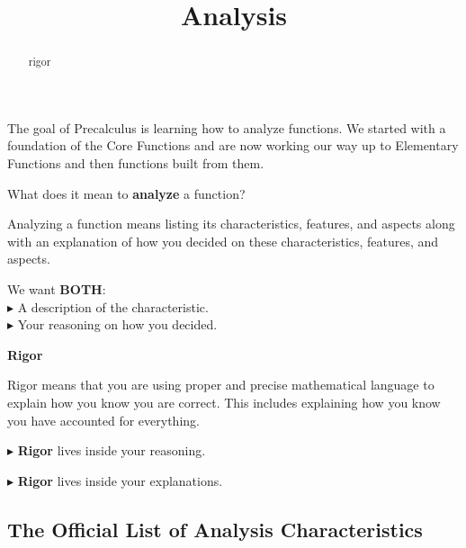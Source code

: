 \documentclass{ximera}
\title{Analysis}
\begin{document}
\begin{abstract}
rigor
\end{abstract}
\maketitle





The goal of Precalculus is learning how to analyze functions.  We started with a foundation of the Core Functions and are now working our way up to Elementary Functions and then functions built from them. 

What does it mean to \textbf{\textcolor{blue!55!black}{analyze}} a function? 



Analyzing a function means listing its characteristics, features, and aspects along with an explanation of how you decided on these characteristics, features, and aspects.


We want \textbf{BOTH}: \\
\textbf{\textcolor{red!70!darkgray}{$\blacktriangleright$}} A description of the characteristic. \\
\textbf{\textcolor{red!70!darkgray}{$\blacktriangleright$}} Your reasoning on how you decided. 



\begin{idea} \textbf{\textcolor{blue!55!black}{Rigor}} 

Rigor means that you are using proper and precise mathematical language to explain how you know you are correct. This includes explaining how you know you have accounted for everything.


\textbf{\textcolor{red!90!darkgray}{$\blacktriangleright$}} \textbf{\textcolor{purple!85!blue}{Rigor}} lives inside your reasoning. 

\textbf{\textcolor{red!90!darkgray}{$\blacktriangleright$}} \textbf{\textcolor{purple!85!blue}{Rigor}} lives inside your explanations. 



\end{idea}



\subsection*{The Official List of Analysis Characteristics}
\end{document}
